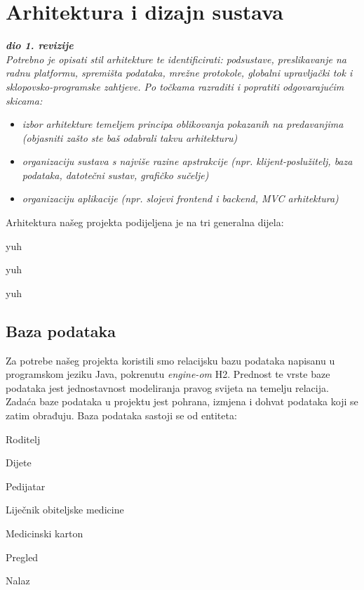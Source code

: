 \chapter{Arhitektura i dizajn sustava}
		
		\textbf{\textit{dio 1. revizije}}\\

		\textit{ Potrebno je opisati stil arhitekture te identificirati: podsustave, preslikavanje na radnu platformu, spremišta podataka, mrežne protokole, globalni upravljački tok i sklopovsko-programske zahtjeve. Po točkama razraditi i popratiti odgovarajućim skicama:}
	\begin{itemize}
		\item 	\textit{izbor arhitekture temeljem principa oblikovanja pokazanih na predavanjima (objasniti zašto ste baš odabrali takvu arhitekturu)}
		\item 	\textit{organizaciju sustava s najviše razine apstrakcije (npr. klijent-poslužitelj, baza podataka, datotečni sustav, grafičko sučelje)}
		\item 	\textit{organizaciju aplikacije (npr. slojevi frontend i backend, MVC arhitektura) }		
	\end{itemize}
		
		\text	Arhitektura našeg projekta podijeljena je na tri generalna dijela:
		\begin{packed_item}
			\item yuh
			\item yuh
			\item yuh
		\end{packed_item}

		

				
		\section{Baza podataka}
			
			\text Za potrebe našeg projekta koristili smo relacijsku bazu podataka napisanu u programskom jeziku Java, pokrenutu \textit{engine-om} H2. Prednost te vrste baze podataka jest jednostavnost modeliranja pravog svijeta na temelju relacija. Zadaća baze podataka u projektu jest pohrana, izmjena i dohvat podataka koji se zatim obrađuju. Baza podataka sastoji se od entiteta:
			\begin{packed_item}
				\item Roditelj
				\item Dijete
				\item Pedijatar
				\item Liječnik obiteljske medicine
				\item Medicinski karton
				\item Pregled
				\item Nalaz
			\end{packed_item}
		
